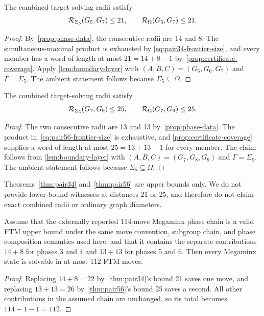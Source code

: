 \begin{theorem}
\label{thm:pair34}
The combined target-solving radii satisfy
\[
  \mathcal{R}_{\Sigma_5}(G_5,G_7)\leq21,
  \qquad
  \mathcal{R}_{\Omega}(G_5,G_7)\leq21.
\]
\end{theorem}

\begin{proof}
By~\cref{prop:phase-data}, the consecutive radii are 14 and 8.  The
simultaneous-maximal product is exhausted by
\cref{eq:pair34-frontier-size}, and every member has a word of length at most
$21=14+8-1$ by~\cref{prop:certificate-coverage}.  Apply
\cref{lem:boundary-layer} with $(A,B,C)=(G_5,G_6,G_7)$ and
$\Gamma=\Sigma_5$.  The ambient statement follows because
$\Sigma_5\subseteq\Omega$.
\end{proof}

\begin{theorem}
\label{thm:pair56}
The combined target-solving radii satisfy
\[
  \mathcal{R}_{\Sigma_5}(G_7,G_9)\leq25,
  \qquad
  \mathcal{R}_{\Omega}(G_7,G_9)\leq25.
\]
\end{theorem}

\begin{proof}
The two consecutive radii are 13 and 13 by~\cref{prop:phase-data}.  The
product in~\cref{eq:pair56-frontier-size} is exhaustive, and
\cref{prop:certificate-coverage} supplies a word of length at most
$25=13+13-1$ for every member.  The claim follows from
\cref{lem:boundary-layer} with $(A,B,C)=(G_7,G_8,G_9)$ and
$\Gamma=\Sigma_5$.  The ambient statement follows because
$\Sigma_5\subseteq\Omega$.
\end{proof}

Theorems~\ref{thm:pair34} and~\ref{thm:pair56} are upper bounds only.  We do
not provide lower-bound witnesses at distances 21 or 25, and therefore do not
claim exact combined radii or ordinary graph diameters.

\begin{corollary}
\label{cor:conditional-112}
Assume that the externally reported 114-move Megaminx phase chain is a valid
FTM upper bound under the same move convention, subgroup chain, and phase
composition semantics used here, and that it contains the separate
contributions $14+8$ for phases 3 and 4 and $13+13$ for phases 5 and 6.  Then
every Megaminx state is solvable in at most 112 FTM moves.
\end{corollary}

\begin{proof}
Replacing $14+8=22$ by~\cref{thm:pair34}'s bound 21 saves one move, and
replacing $13+13=26$ by~\cref{thm:pair56}'s bound 25 saves a second.  All
other contributions in the assumed chain are unchanged, so its total becomes
$114-1-1=112$.
\end{proof}

